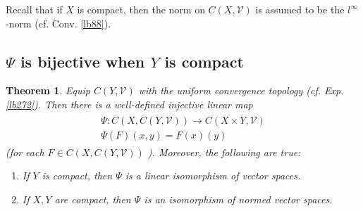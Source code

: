 \documentclass[12pt,b5paper,notitlepage]{article}
\theoremstyle{definition}
\theoremstyle{plain}
\newtheorem{thm}[df]{Theorem}
\newcommand{\mc}{\mathcal}
\numberwithin{equation}{section}
\begin{document}
Recall that if $X$ is compact, then the norm on $C(X,\mc V)$ is assumed to be the $l^\infty$-norm (cf. Conv. \ref{lb88}).


\subsection{$\Psi$ is bijective when $Y$ is compact}



\begin{thm}\label{lb274}
Equip $C(Y,\mc V)$ with the uniform convergence topology (cf. Exp. \ref{lb272}). Then there is a well-defined injective linear map
\begin{gather}\label{eq77}
\begin{gathered}
\Psi:C(X,C(Y,\mc V))\rightarrow C(X\times Y,\mc V)\\[0.5ex]
\Psi(F)(x,y)=F(x)(y)
\end{gathered}
\end{gather}
(for each $F\in C(X,C(Y,\mc V))$ ). Moreover, the following are true:
\begin{enumerate}[label=(\alph*)]
\item If $Y$ is compact, then $\Psi$ is a linear isomorphism of vector spaces.
\item If $X,Y$ are compact, then $\Psi$ is an isomorphism of normed vector spaces.
\end{enumerate}
\end{thm}
\end{document}
